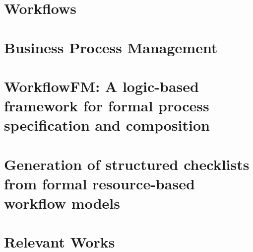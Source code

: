 \section{Workflows}


\section{Business Process Management}



\section{WorkflowFM: A logic-based framework for formal process specification and composition}


\section{Generation of structured checklists from formal resource-based workflow models}

\section{Relevant Works}
